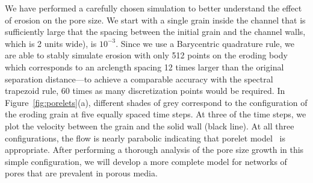\documentclass[11pt]{article}
\begin{document}
We have performed a carefully chosen simulation to better understand the
effect of erosion on the pore size. We start with a single grain inside
the channel that is sufficiently large that the spacing between the
initial grain and the channel walls, which is 2 units wide), is
$10^{-3}$. Since we use a Barycentric quadrature rule, we are able to
stably simulate erosion with only 512 points on the eroding body which
corresponds to an arclength spacing 12 times larger than the original
separation distance---to achieve a comparable accuracy with the spectral
trapezoid rule, 60 times as many discretization points would be
required. In Figure~\ref{fig:porelets}(a), different shades of grey
correspond to the configuration of the eroding grain at five equally
spaced time steps. At three of the time steps, we plot the velocity
between the grain and the solid wall (black line). At all three
configurations, the flow is nearly parabolic indicating that  porelet
model~\cite{dea-qua-bir-jua2018} is appropriate. After performing a
thorough analysis of the pore size growth in this simple configuration,
we will develop a more complete model for networks of pores that are
prevalent in porous media.
\end{document}
